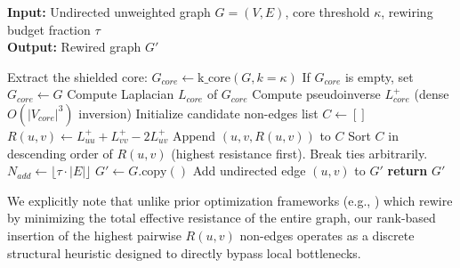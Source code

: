 \documentclass[10pt]{article} %
\begin{document}
\begin{algorithm}[H]
\caption{Core-Shielded Effective Resistance (CSER) Rewiring}
\textbf{Input:} Undirected unweighted graph $G=(V, E)$, core threshold $\kappa$, rewiring budget fraction $\tau$ \\
\textbf{Output:} Rewired graph $G'$
\begin{algorithmic}[1]
\STATE Extract the shielded core: $G_{core} \gets \text{k\_core}(G, k=\kappa)$
\STATE If $G_{core}$ is empty, set $G_{core} \gets G$
\STATE Compute Laplacian $L_{core}$ of $G_{core}$
\STATE Compute pseudoinverse $L^+_{core}$ (dense $O(|V_{core}|^3)$ inversion)
\STATE Initialize candidate non-edges list $C \gets []$
    \STATE $R(u,v) \gets L^+_{uu} + L^+_{vv} - 2L^+_{uv}$
    \STATE Append $(u, v, R(u,v))$ to $C$
\ENDFOR
\STATE Sort $C$ in descending order of $R(u,v)$ (highest resistance first). Break ties arbitrarily.
\STATE $N_{add} \gets \lfloor \tau \cdot |E| \rfloor$
\STATE $G' \gets G.\text{copy}()$
    \STATE Add undirected edge $(u,v)$ to $G'$
\ENDFOR
\STATE \textbf{return} $G'$
\end{algorithmic}
\end{algorithm}

We explicitly note that unlike prior optimization frameworks (e.g., \citet{Black2023}) which rewire by minimizing the total effective resistance of the entire graph, our rank-based insertion of the highest pairwise $R(u,v)$ non-edges operates as a discrete structural heuristic designed to directly bypass local bottlenecks.
\end{document}
